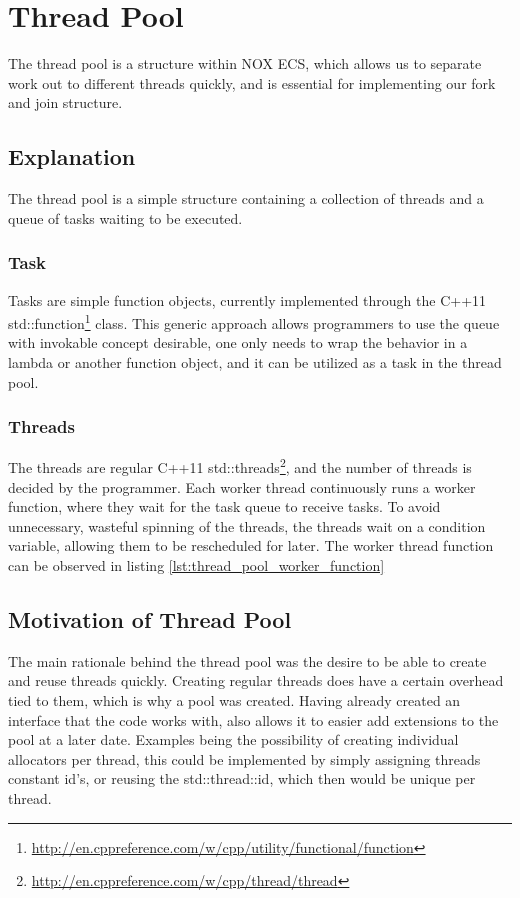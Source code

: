 \section{Thread Pool}
The thread pool is a structure within NOX ECS, which allows us to separate work out to different threads quickly, and is essential for implementing our fork and join structure.

\subsection{Explanation}
The thread pool is a simple structure containing a collection of threads and a queue of tasks waiting to be executed.

\subsubsection{Task}
Tasks are simple function objects, currently implemented through the C++11 std::function\footnote{\url{http://en.cppreference.com/w/cpp/utility/functional/function}} class.
This generic approach allows programmers to use the queue with invokable concept desirable, one only needs to wrap the behavior in a lambda or another function object, and it can be utilized as a task in the thread pool.

\subsubsection{Threads}
The threads are regular C++11 std::threads\footnote{\url{http://en.cppreference.com/w/cpp/thread/thread}}, and the number of threads is decided by the programmer.
Each worker thread continuously runs a worker function, where they wait for the task queue to receive tasks.
To avoid unnecessary, wasteful spinning of the threads, the threads wait on a condition variable,
allowing them to be rescheduled for later.
The worker thread function can be observed in listing \ref{lst:thread_pool_worker_function}


\subsection{Motivation of Thread Pool}
The main rationale behind the thread pool was the desire to be able to create and reuse threads quickly.
Creating regular threads does have a certain overhead tied to them, which is why a pool was created.
Having already created an interface that the code works with, also allows it to easier add extensions to the pool
at a later date. Examples being the possibility of creating individual allocators per thread,
this could be implemented by simply assigning threads constant id's, or reusing the std::thread::id, which then would be unique per thread.

